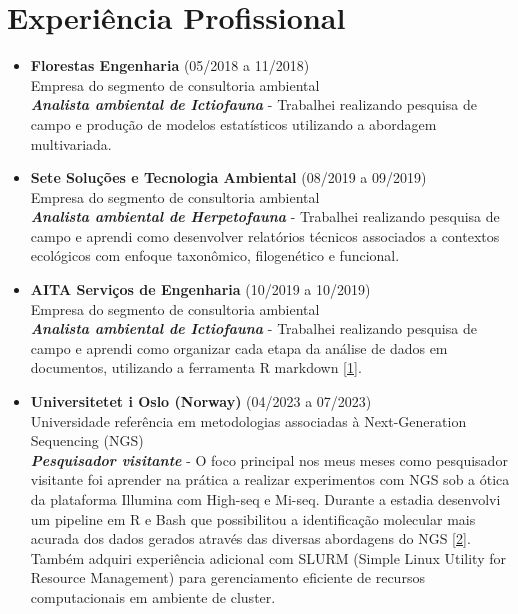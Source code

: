 \documentclass[a4paper,10pt]{article}
\begin{document}
	\section*{Experiência Profissional}
	\begin{itemize}[left=0pt]
		\item \textbf{Florestas Engenharia} (05/2018 a 11/2018)\\
		Empresa do segmento de consultoria ambiental\\
		\textbf{\textit{Analista ambiental de Ictiofauna}} - Trabalhei realizando pesquisa de campo e produção de modelos estatísticos utilizando a abordagem multivariada.
		
		\item \textbf{Sete Soluções e Tecnologia Ambiental} (08/2019 a 09/2019) \\
		Empresa do segmento de consultoria ambiental\\
		\textbf{\textit{Analista ambiental de Herpetofauna}} - Trabalhei realizando pesquisa de campo e aprendi como desenvolver relatórios técnicos associados a contextos ecológicos com enfoque taxonômico, filogenético e funcional.
		
		\item \textbf{AITA Serviços de Engenharia} (10/2019 a 10/2019)\\
		Empresa do segmento de consultoria ambiental\\
		\textbf{\textit{Analista ambiental de Ictiofauna}} - Trabalhei realizando pesquisa de campo e aprendi como organizar cada etapa da análise de dados em documentos, utilizando a ferramenta R markdown [\href{https://github.com/fabricioA14/Functional_Indexes}{1}].
		
		\item \textbf{Universitetet i Oslo (Norway)} (04/2023 a 07/2023)\\
		Universidade referência em metodologias associadas à Next-Generation Sequencing (NGS)\\
		\textbf{\textit{Pesquisador visitante}} - O foco principal nos meus meses como pesquisador visitante foi aprender na prática a realizar experimentos com NGS sob a ótica da plataforma Illumina com High-seq e Mi-seq. Durante a estadia desenvolvi um pipeline em R e Bash que possibilitou a identificação molecular mais acurada dos dados gerados através das diversas abordagens do NGS [\href{https://github.com/fabricioA14/BLAST}{2}]. Também adquiri experiência adicional com SLURM (Simple Linux Utility for Resource Management) para gerenciamento eficiente de recursos computacionais em ambiente de cluster.
	\end{itemize}
	
\end{document}
